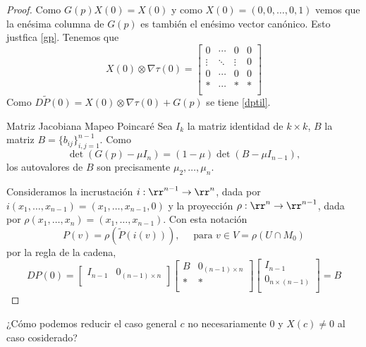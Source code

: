 \begin{proof} Como $G(p)X(0)=X(0)$ y como $X(0)=(0,0,\ldots,0,1)$ vemos que la enésima columna de $G(p)$ es también el enésimo vector canónico. Esto justfica 
\eqref{gp}.
Tenemos que
\[
 X(0)\otimes\nabla\tau(0)=\begin{bmatrix}
         0&\cdots&0&0\\
        \vdots &\ddots&\vdots&0\\
         0&\cdots&0&0\\
         *&\cdots&*&*\\
        \end{bmatrix}
\]
Como $D\tilde{P}(0)=X(0)\otimes\nabla\tau(0)+G(p)$ se tiene \eqref{dptil}.



{Matriz Jacobiana Mapeo Poincaré}
Sea $I_k$ la matriz identidad de $k\times k$, $B$ la matriz $B=\{b_{ij}\}_{i,j=1}^{n-1}$. Como
\[\det (G(p)-\mu I_n)=(1-\mu)\det (B-\mu I_{n-1}),\]
los autovalores de $B$ son precisamente $\mu_2,\ldots,\mu_n$.

Consideramos la incrustación $i:\rr^{n-1}\to\rr^n$, dada por $i(x_1,\ldots,x_{n-1})=(x_1,\ldots,x_{n-1},0)$ y la proyección
 $\rho:\rr^{n}\to\rr^{n-1}$,  dada por $\rho(x_1,\ldots,x_{n})=(x_1,\ldots,x_{n-1})$. Con esta notación
 \[P(v)=\rho(\tilde{P}(i(v))),\quad\text{ para } v\in V=\rho(U\cap M_0)\]
 por la regla de la cadena,
 \[DP(0)=\begin{bmatrix}
         I_{n-1}&0_{(n-1)\times n}\\
        \end{bmatrix}
        \begin{bmatrix}
         B&0_{(n-1)\times n}\\
         *&*\\
        \end{bmatrix}
        \begin{bmatrix}
         I_{n-1}\\0_{n\times (n-1)}\\
        \end{bmatrix} =B
  \]
\end{proof}



\begin{ejercicio} ¿Cómo podemos reducir el caso general $c$ no necesariamente $0$ y $X(c)\neq 0$ al caso cosiderado? 
\end{ejercicio}


